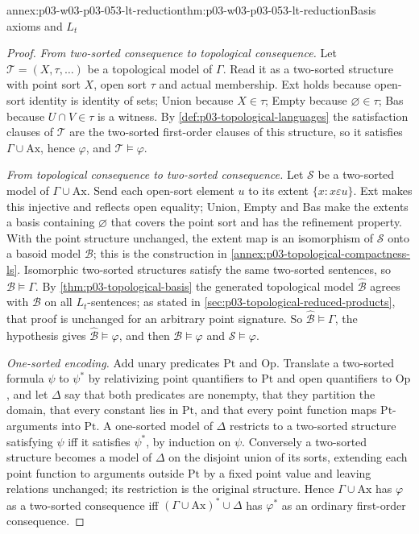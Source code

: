 \begin{annexitem}{annex:p03-w03-p03-053-lt-reduction}{thm:p03-w03-p03-053-lt-reduction}{Basis axioms and \(L_t\)}
\begin{proof}
\emph{From two-sorted consequence to topological consequence.} Let
\(\mathcal T=(X,\tau,\ldots)\) be a topological model of \(\Gamma\). Read
it as a two-sorted structure with point sort \(X\), open sort \(\tau\)
and actual membership. Ext holds because open-sort identity is identity
of sets; Union because \(X\in\tau\); Empty because
\(\varnothing\in\tau\); Bas because \(U\cap V\in\tau\) is a witness.
By \cref{def:p03-topological-languages} the satisfaction clauses of
\(\mathcal T\) are the two-sorted first-order clauses of this structure,
so it satisfies \(\Gamma\cup\mathrm{Ax}\), hence \(\varphi\), and
\(\mathcal T\models\varphi\).

\emph{From topological consequence to two-sorted consequence.} Let
\(\mathcal S\) be a two-sorted model of \(\Gamma\cup\mathrm{Ax}\). Send
each open-sort element \(u\) to its extent \(\{x:x\varepsilon u\}\).
Ext makes this injective and reflects open equality; Union, Empty and Bas
make the extents a basis containing \(\varnothing\) that covers the
point sort and has the refinement property. With the point structure
unchanged, the extent map is an isomorphism of \(\mathcal S\) onto a
basoid model \(\mathcal B\); this is the construction in
\cref{annex:p03-topological-compactness-ls}. Isomorphic two-sorted
structures satisfy the same two-sorted sentences, so
\(\mathcal B\models\Gamma\). By \cref{thm:p03-topological-basis} the
generated topological model \(\widehat{\mathcal B}\) agrees with
\(\mathcal B\) on all \(L_t\)-sentences; as stated in
\cref{sec:p03-topological-reduced-products}, that proof is unchanged for
an arbitrary point signature. So \(\widehat{\mathcal B}\models\Gamma\), the
hypothesis gives \(\widehat{\mathcal B}\models\varphi\), and then
\(\mathcal B\models\varphi\) and \(\mathcal S\models\varphi\).

\emph{One-sorted encoding.} Add unary predicates \(\mathrm{Pt}\) and
\(\mathrm{Op}\). Translate a two-sorted formula \(\psi\) to \(\psi^*\)
by relativizing point quantifiers to \(\mathrm{Pt}\) and open
quantifiers to \(\mathrm{Op}\), and let \(\Delta\) say that both
predicates are nonempty, that they partition the domain, that every
constant lies in \(\mathrm{Pt}\), and that every point function maps
\(\mathrm{Pt}\)-arguments into \(\mathrm{Pt}\). A one-sorted model of
\(\Delta\) restricts to a two-sorted structure satisfying \(\psi\) iff it
satisfies \(\psi^*\), by induction on \(\psi\). Conversely a two-sorted
structure becomes a model of \(\Delta\) on the disjoint union of its
sorts, extending each point function to arguments outside \(\mathrm{Pt}\)
by a fixed point value and leaving relations unchanged; its restriction
is the original structure. Hence \(\Gamma\cup\mathrm{Ax}\) has
\(\varphi\) as a two-sorted consequence iff
\((\Gamma\cup\mathrm{Ax})^*\cup\Delta\) has \(\varphi^*\) as an
ordinary first-order consequence.


\end{proof}
\end{annexitem}
